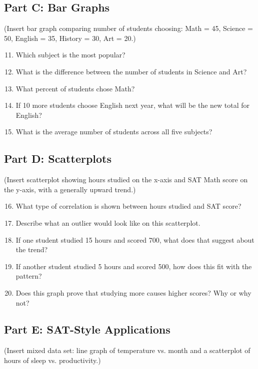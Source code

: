 \documentclass[12pt]{article}
\begin{document}
\subsection*{Part C: Bar Graphs}
(Insert bar graph comparing number of students choosing: Math = 45, Science = 50, English = 35, History = 30, Art = 20.)

\begin{enumerate}
  \setcounter{enumi}{10}
  \item Which subject is the most popular?
  \item What is the difference between the number of students in Science and Art?
  \item What percent of students chose Math?
  \item If 10 more students choose English next year, what will be the new total for English?
  \item What is the average number of students across all five subjects?
\end{enumerate}

\subsection*{Part D: Scatterplots}
(Insert scatterplot showing hours studied on the x-axis and SAT Math score on the y-axis, with a generally upward trend.)

\begin{enumerate}
  \setcounter{enumi}{15}
  \item What type of correlation is shown between hours studied and SAT score?
  \item Describe what an outlier would look like on this scatterplot.
  \item If one student studied 15 hours and scored 700, what does that suggest about the trend?
  \item If another student studied 5 hours and scored 500, how does this fit with the pattern?
  \item Does this graph prove that studying more causes higher scores? Why or why not?
\end{enumerate}

\subsection*{Part E: SAT-Style Applications}
(Insert mixed data set: line graph of temperature vs. month and a scatterplot of hours of sleep vs. productivity.)
\end{document}
